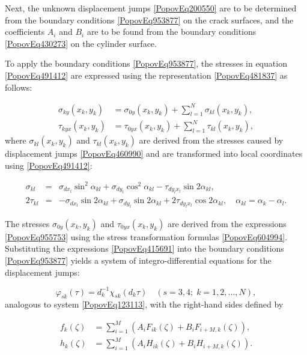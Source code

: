 Next, the unknown displacement jumps \eqref{PopovEq200550} are to be determined from the boundary conditions \eqref{PopovEq953877} on the crack surfaces, and the coefficients $A_i$ and $B_i$ are to be found from the boundary conditions \eqref{PopovEq430273} on the cylinder surface. 

To apply the boundary conditions \eqref{PopovEq953877}, the stresses in equation \eqref{PopovEq491412} are expressed using the representation \eqref{PopovEq481837} as follows:

\begin{equation} \label{PopovEq415691}
	\begin{aligned}
		\sigma_{ky}(x_k, y_k) &= \sigma_{0y}(x_k, y_k) + \displaystyle\sum\limits_{l=1}^{N} \sigma_{kl}(x_k, y_k), \\
		\tau_{kyx}(x_k, y_k) &= \tau_{0yx}(x_k, y_k) + \displaystyle\sum\limits_{l=1}^{N} \tau_{kl}(x_k, y_k),
	\end{aligned}
\end{equation}
where $\sigma_{kl}(x_k, y_k)$ and $\tau_{kl}(x_k, y_k)$ are derived from the stresses caused by displacement jumps \eqref{PopovEq460990} and are transformed into local coordinates using \eqref{PopovEq491412}:

\[
\begin{array}{rcl}
	\sigma_{kl} &=& \sigma_{dx_l} \sin^2 \alpha_{kl} + \sigma_{dy_l} \cos^2 \alpha_{kl} - \tau_{dy_l x_l} \sin 2\alpha_{kl}, \\
	2\tau_{kl} &=& -\sigma_{dx_l} \sin 2\alpha_{kl} + \sigma_{dy_l} \sin 2\alpha_{kl} + 2\tau_{dy_l x_l} \cos 2\alpha_{kl}, \quad \alpha_{kl} = \alpha_k - \alpha_l.
\end{array}
\]

The stresses $\sigma_{0y}(x_k, y_k)$ and $\tau_{0yx}(x_k, y_k)$ are derived from the expressions \eqref{PopovEq955753} using the stress transformation formulas \eqref{PopovEq604994}. Substituting the expressions \eqref{PopovEq415691} into the boundary conditions \eqref{PopovEq953877} yields a system of integro-differential equations for the displacement jumps:

\begin{equation} \label{PopovEq949735}
	\varphi_{sk}(\tau) = d_k^{-1} \chi_{sk}(d_k \tau) \quad (s = 3, 4; \; k = 1, 2, \dots, N),
\end{equation}
analogous to system \eqref{PopovEq123113}, with the right-hand sides defined by

\begin{equation} \label{PopovEq882335}
	\begin{aligned}
		f_k(\zeta) &= \displaystyle\sum_{i=1}^{M} \left( A_i F_{ik}(\zeta) + B_i F_{i+M,k}(\zeta) \right), \\
		h_k(\zeta) &= \displaystyle\sum_{i=1}^{M} \left( A_i H_{ik}(\zeta) + B_i H_{i+M,k}(\zeta) \right).
	\end{aligned}
\end{equation}

